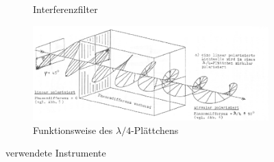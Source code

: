 \begin{figure}
\begin{subfigure}[c]{0.19\textwidth}
        \caption{Interferenzfilter \cite{V46}}
        \label{abb:filter}
    \end{subfigure}
      \begin{subfigure}[c]{0.8\textwidth}
        \includegraphics[width=\textwidth]{l42.png}
        \caption{Funktionsweise des $\lambda/4$-Plättchens \cite{wiki}}
        \label{abb:l4}
    \end{subfigure}
    \caption{verwendete Instrumente}
\end{figure}
